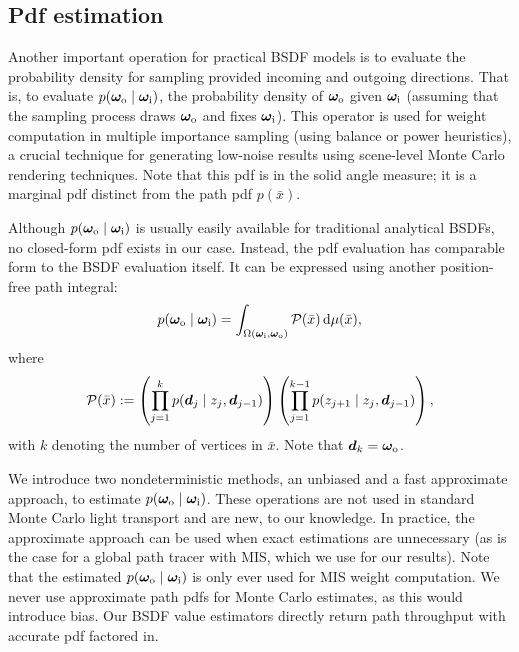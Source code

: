 \subsection{Pdf estimation}
\label{subsec:ours_pdf}

Another important operation for practical BSDF models is to evaluate the probability density for sampling provided incoming and outgoing directions.
That is, to evaluate $p(\bm\omega_\mathrm{o} \;|\; \bm\omega_\mathrm{i})$, the probability density of $\bm\omega_\mathrm{o}$ given $\bm\omega_\mathrm{i}$ (assuming that the sampling process draws $\bm\omega_\mathrm{o}$ and fixes $\bm\omega_\mathrm{i}$).
This operator is used for weight computation in multiple importance sampling (using balance or power heuristics), a crucial technique for generating low-noise results using scene-level Monte Carlo rendering techniques. Note that this pdf is in the solid angle measure; it is a marginal pdf distinct from the path pdf $p(\bar x)$.

Although $p(\bm\omega_\mathrm{o} \;|\; \bm\omega_\mathrm{i})$ is usually easily available for traditional analytical BSDFs, no closed-form pdf exists in our case. Instead, the pdf evaluation has comparable form to the BSDF evaluation itself. It can be expressed using another position-free path integral:
\begin{equation}
	\label{eqn:ours_pdf}
	p(\bm\omega_\mathrm{o} \;|\; \bm\omega_\mathrm{i}) = \int_{\Omega(\bm\omega_\mathrm{i}, \bm\omega_\mathrm{o})} \mathcal{P}(\bar{x}) \,\mathrm{d}\mu(\bar{x}),
\end{equation}
where
\begin{equation}
	\mathcal{P}(\bar{x}) := \left(\prod_{j = 1}^k p(\bm{d}_j \;|\; z_j, \bm{d}_{j - 1})\right) \left(\prod_{j = 1}^{k - 1} p(z_{j + 1} \;|\; z_j, \bm{d}_{j - 1})\right),
\end{equation}
with $k$ denoting the number of vertices in $\bar{x}$. Note that $\bm{d}_k = \bm\omega_\mathrm{o}$.

We introduce two nondeterministic methods, an unbiased and a fast approximate approach, to estimate $p(\bm\omega_\mathrm{o} \;|\; \bm\omega_\mathrm{i})$.
These operations are not used in standard Monte Carlo light transport and are new, to our knowledge.
In practice, the approximate approach can be used when exact estimations are unnecessary (as is the case for a global path tracer with MIS, which we use for our results).
Note that the estimated $p(\bm\omega_\mathrm{o} \;|\; \bm\omega_\mathrm{i})$ is only ever used for MIS weight computation.
We never use approximate path pdfs for Monte Carlo estimates, as this would introduce bias.
Our BSDF value estimators directly return path throughput with accurate pdf factored in.

